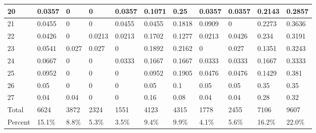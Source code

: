 \documentclass[12pt]{article}
\begin{document}
\begin{table} [h]
{\begin{tabular}{ | l | l | l | l | l | l | l | l | l | l | l |  }
20&0.0357&0&0&0.0357&0.1071&0.25&0.0357&0.0357&0.2143&0.2857 \\ \hline
21&0.0455&0&0&0.0455&0.0455&0.1818&0.0909&0&0.2273&0.3636 \\ \hline
22&0.0426&0&0.0213&0.0213&0.1702&0.1277&0.0213&0.0426&0.234&0.3191 \\ \hline
23&0.0541&0.027&0.027&0&0.1892&0.2162&0&0.027&0.1351&0.3243 \\ \hline
24&0.0667&0&0&0.0333&0.1667&0.1667&0.0333&0.0333&0.1667&0.3333 \\ \hline
25&0.0952&0&0&0&0.0952&0.1905&0.0476&0.0476&0.1429&0.381 \\ \hline
26&0.05&0&0&0&0.05&0.1&0.05&0.05&0.35&0.35 \\ \hline
27&0.04&0.04&0&0&0.16&0.08&0.04&0.04&0.28&0.32 \\ \hline
Total&6624&3872&2324&1551&4123&4315&1778&2455&7106&9607 \\ \hline
Percent&15.1\%&8.8\%&5.3\%&3.5\%&9.4\%&9.9\%&4.1\%&5.6\%&16.2\%&22.0\% \\ \hline
\end{tabular}
}
\end{table}
\end{document}
